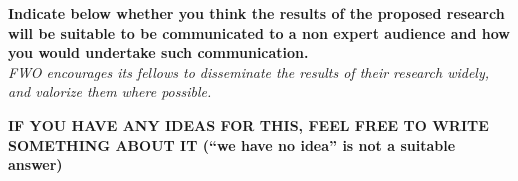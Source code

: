\documentclass[11pt,dvipsnames,usenames,a4paper]{article}
\begin{document}


\renewcommand\refname{\normalsize Enumerate the bibliographical references that are relevant for your research proposal.}


\vspace{5mm}

\textbf{Indicate below whether you think the results of the proposed research will be suitable to be communicated to a non expert audience and how you would undertake such communication.}\\
\textit{FWO encourages its fellows to disseminate the results of their research widely, and valorize them where possible.}


{\bf\color{blue} IF YOU HAVE ANY IDEAS FOR THIS, FEEL FREE TO WRITE SOMETHING ABOUT IT (``we have no idea'' is not a suitable answer)}
\end{document}
